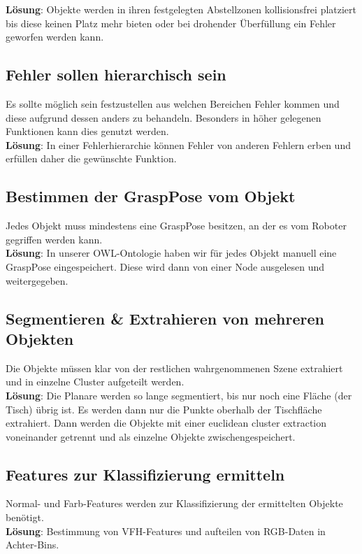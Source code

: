 \documentclass{suturo}
\begin{document}
\textbf{Lösung}: Objekte werden in ihren festgelegten Abstellzonen kollisionsfrei platziert bis diese keinen Platz mehr bieten oder bei drohender Überfüllung ein Fehler geworfen werden kann. 


\subsection{Fehler sollen hierarchisch sein}
Es sollte möglich sein festzustellen aus welchen Bereichen Fehler kommen und diese aufgrund dessen anders zu behandeln. Besonders in höher gelegenen Funktionen kann dies genutzt werden. \\

\textbf{Lösung}: In einer Fehlerhierarchie können Fehler von anderen Fehlern erben und erfüllen daher die gewünschte Funktion.

\subsection{Bestimmen der GraspPose vom Objekt}
Jedes Objekt muss mindestens eine GraspPose besitzen, an der es vom Roboter gegriffen werden kann.\\

\textbf{Lösung}: In unserer OWL-Ontologie haben wir für jedes Objekt manuell eine GraspPose eingespeichert. Diese wird dann von einer Node ausgelesen und weitergegeben.

\subsection{Segmentieren \& Extrahieren von mehreren Objekten}
Die Objekte müssen klar von der restlichen wahrgenommenen Szene extrahiert und in einzelne Cluster aufgeteilt werden.\\
\textbf{Lösung}: Die Planare werden so lange segmentiert, bis nur noch eine Fläche (der Tisch) übrig ist. Es werden dann nur die Punkte oberhalb der Tischfläche extrahiert. Dann werden die Objekte mit einer euclidean cluster extraction voneinander getrennt und als einzelne Objekte zwischengespeichert.

\subsection{Features zur Klassifizierung ermitteln}
Normal- und Farb-Features werden zur Klassifizierung der ermittelten Objekte benötigt. \\
\textbf{Lösung}: Bestimmung von VFH-Features und aufteilen von RGB-Daten in Achter-Bins.
\end{document}
